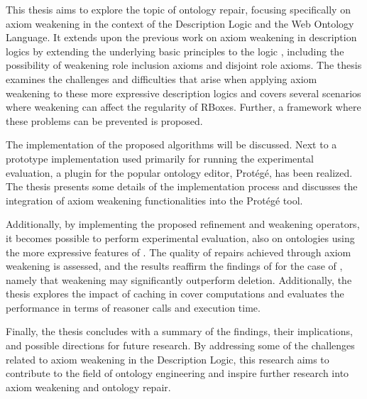 This thesis aims to explore the topic of ontology repair, focusing specifically on axiom weakening in the context of the \SROIQ Description Logic and the Web Ontology Language. It extends upon the previous work on axiom weakening in description logics by extending the underlying basic principles to the logic \SROIQ, including the possibility of weakening role inclusion axioms and disjoint role axioms. The thesis examines the challenges and difficulties that arise when applying axiom weakening to these more expressive description logics and covers several scenarios where weakening can affect the regularity of \SROIQ RBoxes. Further, a framework where these problems can be prevented is proposed.

The implementation of the proposed algorithms will be discussed. Next to a prototype implementation used primarily for running the experimental evaluation, a plugin for the popular ontology editor, Protégé, has been realized. The thesis presents some details of the implementation process and discusses the integration of axiom weakening functionalities into the Protégé tool.

Additionally, by implementing the proposed refinement and weakening operators, it becomes possible to perform experimental evaluation, also on ontologies using the more expressive features of \SROIQ. The quality of repairs achieved through axiom weakening is assessed, and the results reaffirm the findings of \cite{troquard2018repairing} for the case of \SROIQ, namely that weakening may significantly outperform deletion. Additionally, the thesis explores the impact of caching in cover computations and evaluates the performance in terms of reasoner calls and execution time.

Finally, the thesis concludes with a summary of the findings, their implications, and possible directions for future research. By addressing some of the challenges related to axiom weakening in the \SROIQ Description Logic, this research aims to contribute to the field of ontology engineering and inspire further research into axiom weakening and ontology repair.

